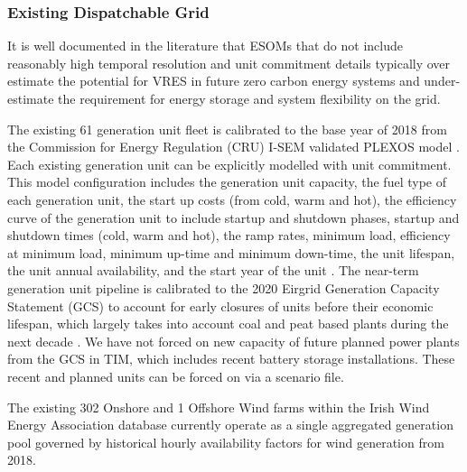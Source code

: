\documentclass[journal abbreviation, manuscript]{copernicus}
\begin{document}
\subsubsection{Existing Dispatchable Grid}
It is well documented in the literature that ESOMs that do not include reasonably high temporal resolution and unit commitment details typically over estimate the potential for VRES in future zero carbon energy systems and under-estimate the requirement for energy storage and system flexibility on the grid.

The existing 61 generation unit fleet is calibrated to the base year of 2018 from the Commission for Energy Regulation (CRU) I-SEM validated PLEXOS model \citep{Geffert2018}. Each existing generation unit can be explicitly modelled with unit commitment. This model configuration includes the generation unit capacity, the fuel type of each generation unit, the start up costs (from cold, warm and hot), the efficiency curve of the generation unit to include startup and shutdown phases, startup and shutdown times (cold, warm and hot), the ramp rates, minimum load, efficiency at minimum load, minimum up-time and minimum down-time, the unit lifespan, the unit annual availability, and the start year of the unit \citep{Geffert2018}. The near-term generation unit pipeline is calibrated to the 2020 Eirgrid Generation Capacity Statement (GCS) to account for early closures of units before their economic lifespan, which largely takes into account coal and peat based plants during the next decade \citep{EirGridadSONI2019}. We have not forced on new capacity of future planned power plants from the GCS in TIM, which includes recent battery storage installations. These recent and planned units can be forced on via a scenario file. 

The existing 302 Onshore and 1 Offshore Wind farms within the Irish Wind Energy Association database currently operate as a single aggregated generation pool governed by historical hourly availability factors for wind generation from 2018.
\end{document}
